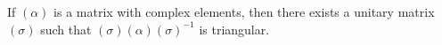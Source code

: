 If $(\alpha)$ is a matrix with complex elements, then there exists a unitary matrix $(\sigma)$ such that $(\sigma)(\alpha)(\sigma)^{-1}$ is triangular.
